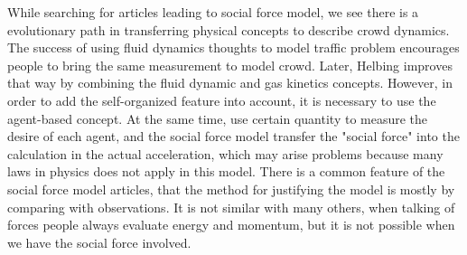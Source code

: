 While searching for articles leading to social force model, we see there is a 
evolutionary path in transferring physical concepts to describe crowd dynamics.
The success of using fluid dynamics thoughts to model traffic problem encourages 
people to bring the same measurement to model crowd. 
Later, Helbing improves that way by combining the fluid dynamic and gas kinetics 
concepts. \cite{social-force} However, in order to add the self-organized feature 
into account, it is necessary to use the agent-based concept.  At the same time, 
use certain quantity to measure the desire of each agent, and the social force model 
transfer the "social force" into the calculation in the actual acceleration, which may
arise problems because many laws in physics does not apply in this model. 
There is a common feature of the social force model articles, that the method for 
justifying the model is mostly by comparing with observations. It is not 
similar with many others, when talking of forces people always evaluate energy 
and momentum, but it is not possible when we have the social force involved.

